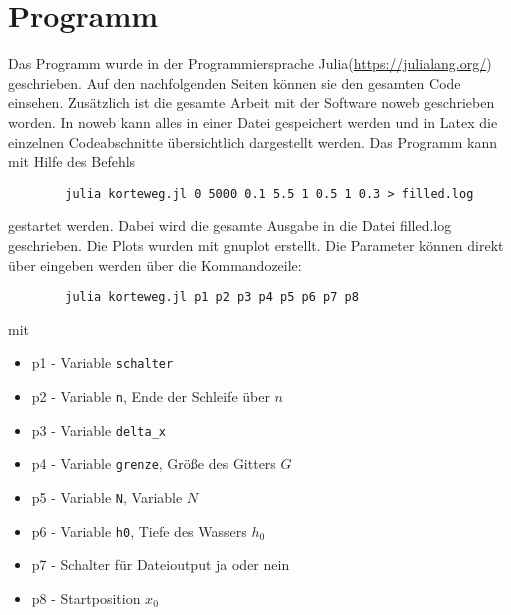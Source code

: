 \documentclass[10pt,fleqn,%
reqno,a4paper]{article}
\begin{document}
\newpage

\section{Programm}
Das Programm wurde in der Programmiersprache Julia(\url{https://julialang.org/}) geschrieben. 
Auf den nachfolgenden Seiten können sie den gesamten Code einsehen. 
Zusätzlich ist die gesamte Arbeit mit der Software noweb geschrieben worden.
In noweb kann alles in einer Datei gespeichert werden und in Latex die einzelnen Codeabschnitte übersichtlich dargestellt werden.
Das Programm kann mit Hilfe des Befehls

\begin{verbatim}
        julia korteweg.jl 0 5000 0.1 5.5 1 0.5 1 0.3 > filled.log
\end{verbatim}

gestartet werden. 
Dabei wird die gesamte Ausgabe in die Datei filled.log geschrieben.
Die Plots wurden mit gnuplot erstellt.
Die Parameter können direkt über eingeben werden über die Kommandozeile:
\begin{verbatim}
        julia korteweg.jl p1 p2 p3 p4 p5 p6 p7 p8
\end{verbatim}

mit

\begin{itemize}
        \item p1 - Variable \verb|schalter| 
        \item p2 - Variable \verb|n|, Ende der Schleife über $ n $
        \item p3 - Variable \verb|delta_x|
        \item p4 - Variable \verb|grenze|, Größe des Gitters $ G $
        \item p5 - Variable \verb|N|, Variable $ N $
        \item p6 - Variable \verb|h0|, Tiefe des Wassers $ h_0 $
        \item p7 - Schalter für Dateioutput ja oder nein
        \item p8 - Startposition $ x_0 $
\end{itemize}
\end{document}
